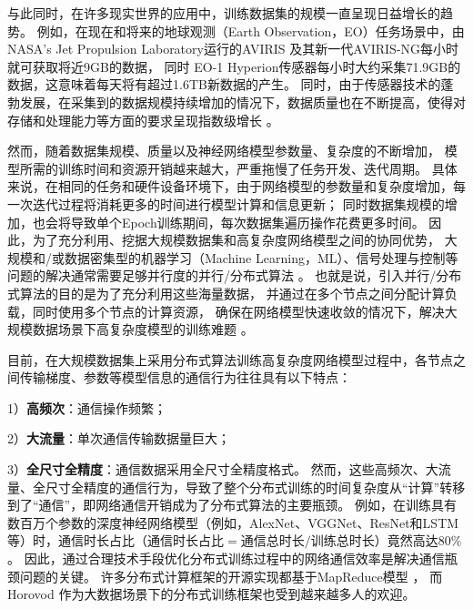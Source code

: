 \documentclass{xdupgthesis}
\begin{document}
与此同时，在许多现实世界的应用中，训练数据集的规模一直呈现日益增长的趋势。
例如，在现在和将来的地球观测（Earth Observation，EO）任务场景中，由 NASA’s Jet Propulsion Laboratory运行的AVIRIS \cite{green1998imaging} 
及其新一代AVIRIS-NG每小时就可获取将近9GB的数据，
同时 EO-1 Hyperion传感器每小时大约采集71.9GB的数据，这意味着每天将有超过1.6TB新数据的产生。
同时，由于传感器技术的蓬勃发展，在采集到的数据规模持续增加的情况下，数据质量也在不断提高，使得对存储和处理能力等方面的要求呈现指数级增长 
\cite{chang2003hyperspectral} \cite{li2017spatial} \cite{zhang2019remotely}\cite{马纪涛2023端到端分布式联合优化的空谱自编码密度估计模型}。

然而，随着数据集规模、质量以及神经网络模型参数量、复杂度的不断增加，
模型所需的训练时间和资源开销越来越大，严重拖慢了任务开发、迭代周期。
具体来说，在相同的任务和硬件设备环境下，由于网络模型的参数量和复杂度增加，每一次迭代过程将消耗更多的时间进行模型计算和信息更新；
同时数据集规模的增加，也会将导致单个Epoch训练期间，每次数据集遍历操作花费更多时间。
因此，为了充分利用、挖据大规模数据集和高复杂度网络模型之间的协同优势，
大规模和/或数据密集型的机器学习（Machine Learning，ML）、信号处理与控制等问题的解决通常需要足够并行度的并行/分布式算法 \cite{plaza2011parallel}。
也就是说，引入并行/分布式算法的目的是为了充分利用这些海量数据，
并通过在多个节点之间分配计算负载，同时使用多个节点的计算资源，
确保在网络模型快速收敛的情况下，解决大规模数据场景下高复杂度模型的训练难题
\cite{zinkevich2010parallelized} 
\cite{chilimbi2014project} 
\cite{xing2015petuum} 
\cite{moritz2015sparknet} 。

目前，在大规模数据集上采用分布式算法训练高复杂度网络模型过程中，各节点之间传输梯度、参数等模型信息的通信行为往往具有以下特点\cite{b_分布式2018}：

1）\textbf{高频次}：通信操作频繁；

2）\textbf{大流量}：单次通信传输数据量巨大；

3）\textbf{全尺寸全精度}：通信数据采用全尺寸全精度格式。 
\newline
然而，这些高频次、大流量、全尺寸全精度的通信行为，导致了整个分布式训练的时间复杂度从“计算”转移到了“通信”，即网络通信开销成为了分布式算法的主要瓶颈。
例如，在训练具有数百万个参数的深度神经网络模型（例如，AlexNet、VGGNet、ResNet和LSTM等）时，通信时长占比（$\mbox{通信时长占比} = \mbox{通信总时长} / \mbox{训练总时长}$）竟然高达80$\%$ \cite{alistarh2017qsgd}\cite{lin2017deep}\cite{seide20141}。
因此，通过合理技术手段优化分布式训练过程中的网络通信效率是解决通信瓶颈问题的关键。
许多分布式计算框架的开源实现都基于MapReduce模型 \cite{dean2008mapreduce}，
而Horovod \cite{sergeev2018horovod}作为大数据场景下的分布式训练框架也受到越来越多人的欢迎。
\end{document}

